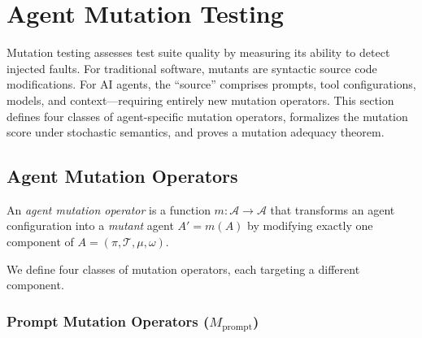 
\section{Agent Mutation Testing}
\label{sec:mutation}

Mutation testing assesses test suite quality by measuring its ability to
detect injected faults. For traditional software, mutants are syntactic
source code modifications. For AI agents, the ``source'' comprises
prompts, tool configurations, models, and context---requiring entirely
new mutation operators. This section defines four classes of
agent-specific mutation operators, formalizes the mutation score under
stochastic semantics, and proves a mutation adequacy theorem.

\subsection{Agent Mutation Operators}
\label{sec:mutation:operators}

\begin{definition}
\label{def:mutation-operator}
An \emph{agent mutation operator} is a function $m: \mathcal{A} \to
\mathcal{A}$ that transforms an agent configuration into a \emph{mutant}
agent $A' = m(A)$ by modifying exactly one component of
$A = (\pi, \mathcal{T}, \mu, \omega)$.
\end{definition}

We define four classes of mutation operators, each targeting a different
component.

\subsubsection{Prompt Mutation Operators ($M_{\text{prompt}}$)}
\label{sec:mutation:prompt}

